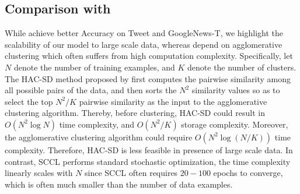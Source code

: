 \documentclass[11pt]{article}
\begin{document}
\subsection{Comparison with \citet{rakib2020enhancement}}
\label{appendix_rakib}
While \citet{rakib2020enhancement} achieve better Accuracy on Tweet and GoogleNews-T, we highlight the scalability of our model to large scale data, whereas \citet{rakib2020enhancement} depend on agglomerative clustering which often suffers from high computation complexity. Specifically, let $N$ denote the number of training examples, and $K$ denote the number of clusters. The HAC-SD method proposed by \citet{rakib2020enhancement} first computes the pairwise similarity among all possible pairs of the data, and then sorts the $N^2$ similarity values so as to select the top $N^2/K$ pairwise similarity as the input to the agglomerative clustering algorithm. Thereby, before clustering, HAC-SD could result in $O(N^2\log N)$ time complexity, and  $O(N^2/K)$ storage complexity. Moreover, the agglomerative clustering algorithm could require $O(N^2\log(N/K))$ time complexity. Therefore, HAC-SD is less feasible in presence of large scale data. In contrast, SCCL performs standard stochastic optimization, the time complexity linearly scales with $N$ since SCCL often requires $20-100$ epochs to converge, which is often much smaller than the number of data examples. 
\end{document}
